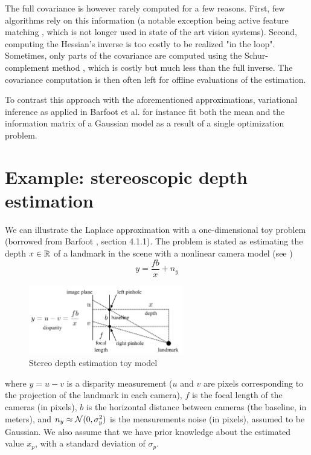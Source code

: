 The full covariance is however rarely computed for a few reasons. First, few algorithms rely on this information (a notable exception being active feature matching \cite{davison2007monoslam}, which is not longer used in state of the art vision systems). Second, computing the Hessian's inverse is too costly to be realized "in the loop". Sometimes, only parts of the covariance are computed using the Schur-complement method \cite{konolige2005slam}, which is costly but much less than the full inverse.
The covariance computation is then often left for offline evaluations of the estimation.

To contrast this approach with the aforementioned approximations, variational inference as applied in Barfoot et al. 
\cite{barfoot2020exactly} for instance fit both the mean and the information matrix of a Gaussian model as a result of a single optimization problem.



\section{Example: stereoscopic depth estimation}

We can illustrate the Laplace approximation with a one-dimensional toy problem (borrowed from Barfoot \cite{barfoot2017state}, section 4.1.1).
The problem is stated as estimating the depth $x \in \mathbb{R}$ of a landmark in the scene with a nonlinear camera model (see )
%
\begin{equation}
    y = \frac{fb}{x} + n_y
\end{equation}
%
%
\begin{figure}[h]
    \centering
    \includegraphics[width=0.6\textwidth]{figures/barfoot_stereo.png}
    \caption{Stereo depth estimation toy model \cite{barfoot2017state}}
    \label{fig:barfoot_stereo}
 \end{figure}
%
where $y=u - v$ is a disparity measurement ($u$ and $v$ are pixels corresponding to the projection of the landmark in each camera), $f$ is the focal
length of the cameras (in pixels), $b$ is the horizontal distance between cameras (the baseline, in meters), and $n_y \approx \mathcal{N}({0},{\sigma_y^2})$ 
is the measurements noise (in pixels), assumed to be Gaussian. We also assume that we have prior knowledge about the 
estimated value $x_p$, with a standard deviation of $\sigma_p$.

